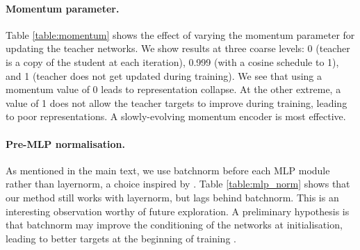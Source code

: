 \documentclass{article} \usepackage{iclr2023_conference,times}
\begin{document}
\paragraph{Momentum parameter.}
Table \ref{table:momentum} shows the effect of varying the momentum parameter for updating the teacher networks. We show results at three coarse levels: 0 (teacher is a copy of the student at each iteration), 0.999 (with a cosine schedule to 1), and 1 (teacher does not get updated during training). We see that using a momentum value of 0 leads to representation collapse. At the other extreme, a value of 1 does not allow the teacher targets to improve during training, leading to poor representations. A slowly-evolving momentum encoder is most effective.

\paragraph{Pre-MLP normalisation.} \label{sec:pre_mlp}
As mentioned in the main text, we use batchnorm before each MLP module rather than layernorm, a choice inspired by \citet{chen2021empirical}. Table \ref{table:mlp_norm} shows that our method still works with layernorm, but lags behind batchnorm. This is an interesting observation worthy of future exploration. A preliminary hypothesis is that batchnorm may improve the conditioning of the networks at initialisation, leading to better targets at the beginning of training \citep{richemond2020byol}.
\end{document}
